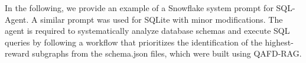\documentclass{article} %
\begin{document}




In the following, we provide an example of a Snowflake system prompt for SQL-Agent. A similar prompt was used for SQLite with minor modifications. The agent is required to systematically analyze database schemas and execute SQL queries by following a workflow that prioritizes the identification of the highest-reward subgraphs from the schema.json files, which were built using QAFD-RAG.
\end{document}
